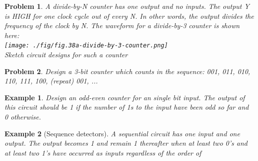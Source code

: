 \documentclass{article}
\newtheorem{example}{Example}
\newtheorem{prob}{Problem}
\begin{document}
\begin{prob}
  A divide-by-N counter has one output and no inputs. The output Y is HIGH for
  one clock cycle out of every N. In other words, the output divides the frequency
  of the clock by N. The waveform for a divide-by-3 counter is shown here:\\
  \texttt{[image: ./fig/fig.38a-divide-by-3-counter.png]}\\
  Sketch circuit designs for such a counter
\end{prob}

\begin{prob}
  Design a 3-bit counter which counts in the sequence:
  001, 011, 010, 110, 111, 100, (repeat) 001, ...
\end{prob}

\begin{example}
  Design an odd-even counter for an single bit input. The output of this circuit
  should be 1 if the number of 1s to the input have been odd so far and 0
  otherwise.
\end{example}

\begin{example}[Sequence detectors]
  A sequential circuit has one input and one output. The output becomes 1 and
  remain 1 thereafter when at least two 0's and at least two 1's have occurred
  as inputs regardless of the order of 
\end{example}
\end{document}
